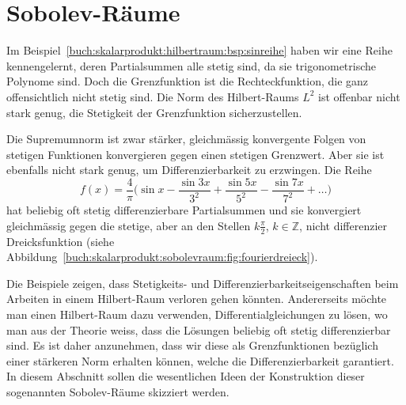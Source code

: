 %
%
%
\section{Sobolev-Räume
\label{buch:skalarprodukt:section:sobolev}}
Im Beispiel~\ref{buch:skalarprodukt:hilbertraum:bsp:sinreihe} haben 
wir eine Reihe kennengelernt, deren Partialsummen alle stetig sind,
da sie trigonometrische Polynome sind.
Doch die Grenzfunktion ist die Rechteckfunktion, die ganz offensichtlich
nicht stetig sind.
Die Norm des Hilbert-Raums $L^2$ ist offenbar nicht stark genug, die
Stetigkeit der Grenzfunktion sicherzustellen.

%
Die Supremumnorm ist zwar stärker, gleichmässig konvergente Folgen
von stetigen Funktionen konvergieren gegen einen stetigen Grenzwert.
Aber sie ist ebenfalls nicht stark genug, um Differenzierbarkeit zu erzwingen.
Die Reihe
\begin{equation}
f(x)
=
\frac{4}{\pi}\biggl(
\sin x - \frac{\sin 3x}{3^2} + \frac{\sin 5x}{5^2} -\frac{\sin 7x}{7^2} +\dots
\biggr)
\label{buch:skalarprodukt:sobolevraum:eqn:fourierdreieck}
\end{equation}
hat beliebig oft stetig differenzierbare Partialsummen und sie konvergiert
gleichmässig gegen die stetige, aber an den Stellen $k\frac{\pi}2$,
$k\in\mathbb{Z}$, nicht differenzier Dreicksfunktion (siehe
Abbildung~\ref{buch:skalarprodukt:sobolevraum:fig:fourierdreieck}).

Die Beispiele zeigen, dass Stetigkeits- und Differenzierbarkeitseigenschaften
beim Arbeiten in einem Hilbert-Raum verloren gehen könnten.
Andererseits möchte man einen Hilbert-Raum dazu verwenden,
Differentialgleichungen zu lösen, wo man aus der Theorie weiss, dass
die Lösungen beliebig oft stetig differenzierbar sind.
Es ist daher anzunehmen, dass wir diese als Grenzfunktionen bezüglich
einer stärkeren Norm erhalten können, welche die Differenzierbarkeit
garantiert.
In diesem Abschnitt sollen die wesentlichen Ideen der Konstruktion
dieser sogenannten Sobolev-Räume skizziert werden.

%
%
